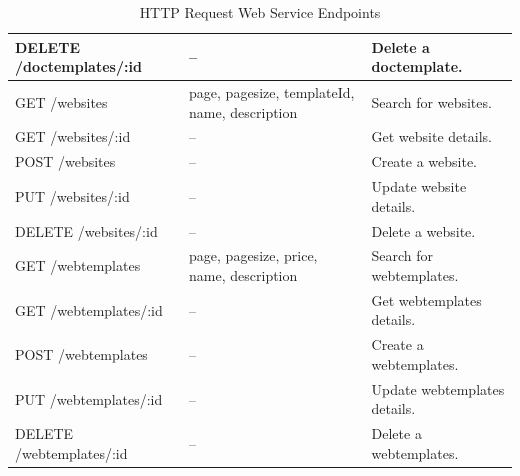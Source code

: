 \documentclass{article}
\begin{document}
\begin{table}[H]
\begin{tabular}{|l|p{4.5cm}|l|}
         DELETE /doctemplates/:id & -- & Delete a doctemplate. \\\hline
         GET /websites & page, pagesize, templateId, name, description & Search for websites. \\\hline
         GET /websites/:id & -- & Get website details. \\\hline
         POST /websites & -- & Create a website. \\\hline
         PUT /websites/:id & -- & Update website details. \\\hline
         DELETE /websites/:id & -- & Delete a website. \\\hline
         GET /webtemplates & page, pagesize, price, name, description & Search for webtemplates. \\\hline
         GET /webtemplates/:id & -- & Get webtemplates details. \\\hline
         POST /webtemplates & -- & Create a webtemplates. \\\hline
         PUT /webtemplates/:id & -- & Update webtemplates details. \\\hline
         DELETE /webtemplates/:id & -- & Delete a webtemplates. \\\hline
    \end{tabular}
    \caption{HTTP Request Web Service Endpoints}
    \label{endpoints}
\end{table}
\end{document}
